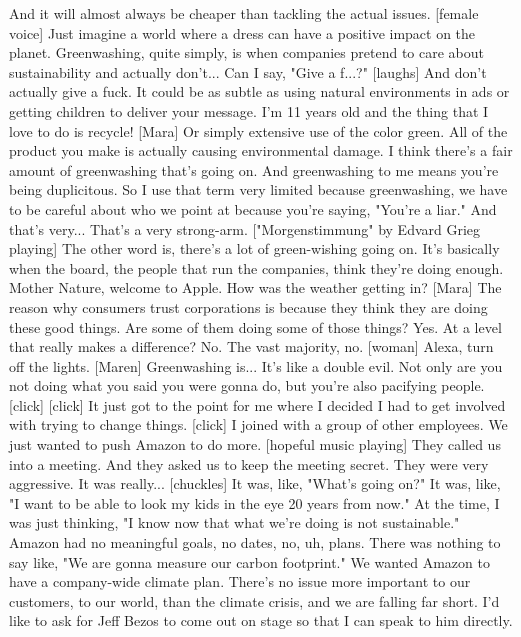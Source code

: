 \documentclass[a4paper]{article}
\begin{document}
	And it will almost always be cheaper than tackling the actual issues.
	[female voice] Just imagine a world where a dress
	can have a positive impact on the planet.
	Greenwashing, quite simply, is when companies pretend to care about
	sustainability and actually don't... Can I say, "Give a f...?"
	[laughs]
	And don't actually give a fuck.
	It could be as subtle as using natural environments in ads
	or getting children to deliver your message.
	I'm 11 years old and the thing that I love to do is recycle!
	[Mara] Or simply extensive use of the color green.
	All of the product you make is actually causing environmental damage.
	I think there's a fair amount of greenwashing that's going on.
	And greenwashing to me means you're being duplicitous.
	So I use that term very limited
	because greenwashing, we have to be careful about who we point at
	because you're saying, "You're a liar."
	And that's very... That's a very strong-arm.
	["Morgenstimmung" by Edvard Grieg playing]
	The other word is, there's a lot of green-wishing going on.
	It's basically when the board,
	the people that run the companies, think they're doing enough.
	Mother Nature,
	welcome to Apple.
	How was the weather getting in?
	[Mara] The reason why consumers trust corporations
	is because they think they are doing these good things.
	Are some of them doing some of those things? Yes.
	At a level that really makes a difference? No.
	The vast majority, no.
	[woman] Alexa, turn off the lights.
	[Maren] Greenwashing is... It's like a double evil.
	Not only are you not doing what you said you were gonna do,
	but you're also
	pacifying people.
	[click]
	[click]
	It just got to the point for me where I decided I had to get involved with
	trying to change things.
	[click]
	I joined with a group of other employees.
	We just wanted to push Amazon to do more.
	[hopeful music playing]
	They called us into a meeting.
	And they asked us to keep the meeting secret.
	They were very aggressive. It was really...
	[chuckles] It was, like, "What's going on?"
	It was, like, "I want to be able to look my kids in the eye 20 years from now."
	At the time, I was just thinking,
	"I know now that what we're doing is not sustainable."
	Amazon had no meaningful goals,
	no dates, no, uh, plans.
	There was nothing to say like,
	"We are gonna measure our carbon footprint."
	We wanted Amazon to have a company-wide climate plan.
	There's no issue more important to our customers,
	to our world, than the climate crisis,
	and we are falling far short.
	I'd like to ask for Jeff Bezos to come out on stage
	so that I can speak to him directly.
\end{document}
